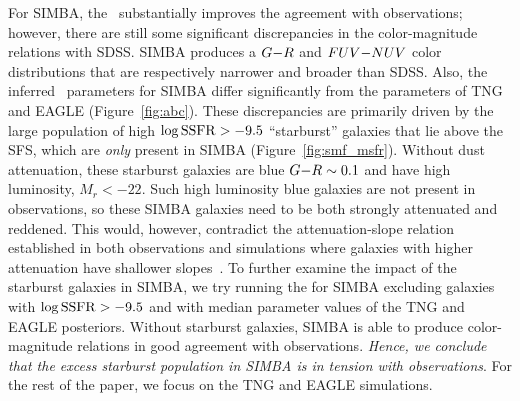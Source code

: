 For SIMBA, the \eda~substantially improves the agreement with observations;
however, there are still some significant discrepancies in the color-magnitude
relations with SDSS. SIMBA produces a $G{-}R$ and $FUV{-}NUV$ color distributions that 
are respectively narrower and broader than SDSS. Also, the inferred \eda~parameters 
for SIMBA differ significantly from the parameters of TNG and EAGLE
(Figure~\ref{fig:abc}). These discrepancies are primarily driven by the
large population of high $\log{\rm SSFR} > -9.5$ ``starburst'' galaxies that
lie above the SFS, which are {\em only} present in SIMBA (Figure~\ref{fig:smf_msfr}). 
Without dust attenuation, these starburst galaxies are blue $G{-}R\sim0.1$ and
have high luminosity, $M_r < -22$. Such high luminosity blue galaxies are not
present in observations, so these SIMBA galaxies need to be both strongly 
attenuated and reddened. This would, however, contradict the attenuation-slope 
relation established in both observations and simulations where galaxies with 
higher attenuation have shallower
slopes~\citep{inoue2005,chevallard2013,salim2018,salim2020,trayford2020}.
To further examine the impact of the starburst galaxies in SIMBA, we try
running the \eda for SIMBA excluding galaxies with $\log{\rm SSFR} > -9.5$ and 
with median parameter values of the TNG and EAGLE posteriors. Without starburst
galaxies, SIMBA is able to produce color-magnitude relations in good agreement 
with observations. {\em Hence, we conclude that the excess starburst population in 
SIMBA is in tension with observations}. For the rest of the paper, we focus on
the TNG and EAGLE simulations.  

